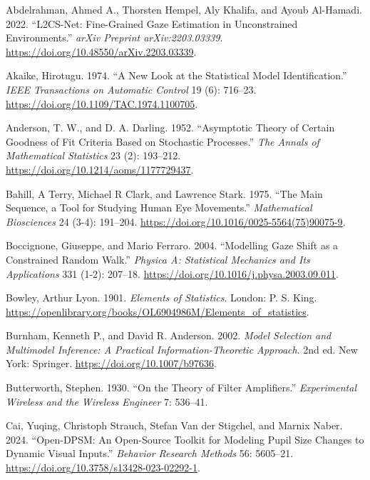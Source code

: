\documentclass[
]{article}
\newlength{\cslhangindent}
\newenvironment{CSLReferences}[2] %
 {\begin{list}{}{%
  \setlength{\itemindent}{0pt}
  \setlength{\leftmargin}{0pt}
  \setlength{\parsep}{0pt}
  \ifodd #1
   \setlength{\leftmargin}{\cslhangindent}
   \setlength{\itemindent}{-1\cslhangindent}
  \fi
  \setlength{\itemsep}{#2\baselineskip}}}
 {\end{list}}
\begin{document}
\label{refs}
\begin{CSLReferences}{1}{0}
Abdelrahman, Ahmed A., Thorsten Hempel, Aly Khalifa, and Ayoub
Al-Hamadi. 2022. {``L2CS-Net: Fine-Grained Gaze Estimation in
Unconstrained Environments.''} \emph{arXiv Preprint arXiv:2203.03339}.
\url{https://doi.org/10.48550/arXiv.2203.03339}.

Akaike, Hirotugu. 1974. {``A New Look at the Statistical Model
Identification.''} \emph{IEEE Transactions on Automatic Control} 19 (6):
716--23. \url{https://doi.org/10.1109/TAC.1974.1100705}.

Anderson, T. W., and D. A. Darling. 1952. {``Asymptotic Theory of
Certain Goodness of Fit Criteria Based on Stochastic Processes.''}
\emph{The Annals of Mathematical Statistics} 23 (2): 193--212.
\url{https://doi.org/10.1214/aoms/1177729437}.

Bahill, A Terry, Michael R Clark, and Lawrence Stark. 1975. {``The Main
Sequence, a Tool for Studying Human Eye Movements.''} \emph{Mathematical
Biosciences} 24 (3-4): 191--204.
\url{https://doi.org/10.1016/0025-5564(75)90075-9}.

Boccignone, Giuseppe, and Mario Ferraro. 2004. {``Modelling Gaze Shift
as a Constrained Random Walk.''} \emph{Physica A: Statistical Mechanics
and Its Applications} 331 (1-2): 207--18.
\url{https://doi.org/10.1016/j.physa.2003.09.011}.

Bowley, Arthur Lyon. 1901. \emph{Elements of Statistics}. London: P. S.
King.
\url{https://openlibrary.org/books/OL6904986M/Elements_of_statistics}.

Burnham, Kenneth P., and David R. Anderson. 2002. \emph{Model Selection
and Multimodel Inference: A Practical Information-Theoretic Approach}.
2nd ed. New York: Springer. \url{https://doi.org/10.1007/b97636}.

Butterworth, Stephen. 1930. {``On the Theory of Filter Amplifiers.''}
\emph{Experimental Wireless and the Wireless Engineer} 7: 536--41.

Cai, Yuqing, Christoph Strauch, Stefan Van der Stigchel, and Marnix
Naber. 2024. {``Open-DPSM: An Open-Source Toolkit for Modeling Pupil
Size Changes to Dynamic Visual Inputs.''} \emph{Behavior Research
Methods} 56: 5605--21. \url{https://doi.org/10.3758/s13428-023-02292-1}.


\end{CSLReferences}
\end{document}
